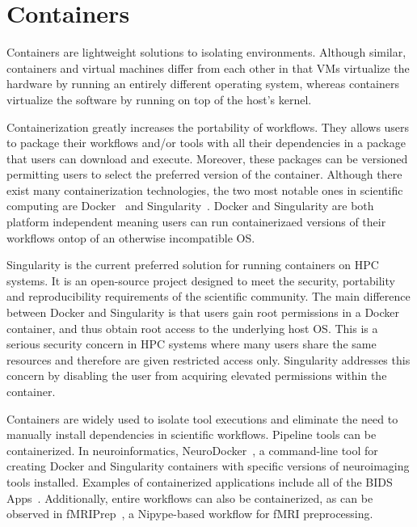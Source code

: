 \documentclass{report}
\begin{document}
       \section{Containers}

            Containers are lightweight solutions to isolating 
            environments. Although similar, containers and virtual machines 
            differ from each 
            other in that VMs virtualize the
            hardware by running an entirely different operating system, whereas
            containers virtualize the software by running on top of the host's
            kernel. 
        
            Containerization greatly increases the portability of workflows. 
            They allows users to package their workflows and/or tools with all 
            their dependencies in a package that users can download and 
            execute. Moreover, these packages can be versioned permitting users 
            to select the preferred version of the container. Although there 
            exist many containerization technologies, the two most notable ones
            in scientific computing are Docker~\cite{merkel2014docker} and 
            Singularity~\cite{10.1371/journal.pone.0177459}. Docker and 
            Singularity are both platform independent meaning users can run
            containerizaed versions of their workflows ontop of an otherwise
            incompatible OS.

            Singularity is the current preferred solution for running 
            containers on HPC systems. It is an open-source project designed to
            meet the security, portability and reproducibility requirements of 
            the scientific community. The main difference between Docker and 
            Singularity is that users gain root permissions in a Docker 
            container, and thus obtain root access to the underlying host OS. 
            This is a serious security concern in HPC systems where many users
            share the same resources and therefore are given restricted access
            only. Singularity addresses this concern by disabling the user from
            acquiring elevated permissions within the container. 

            Containers are widely used to isolate tool executions and eliminate
            the need to manually install dependencies in scientific workflows.
            Pipeline tools can be containerized. In neuroinformatics, 
            NeuroDocker~\cite{neurodoc}, a command-line tool for creating Docker and 
            Singularity containers with specific versions of neuroimaging tools
            installed. Examples of 
            containerized applications include all of the BIDS Apps~\cite{10.1371/journal.pcbi.1005209}. 
            Additionally, entire workflows can also be containerized, as can be
            observed in fMRIPrep~\cite{Esteban306951}, a Nipype-based workflow for fMRI 
            preprocessing.
            
\end{document}
